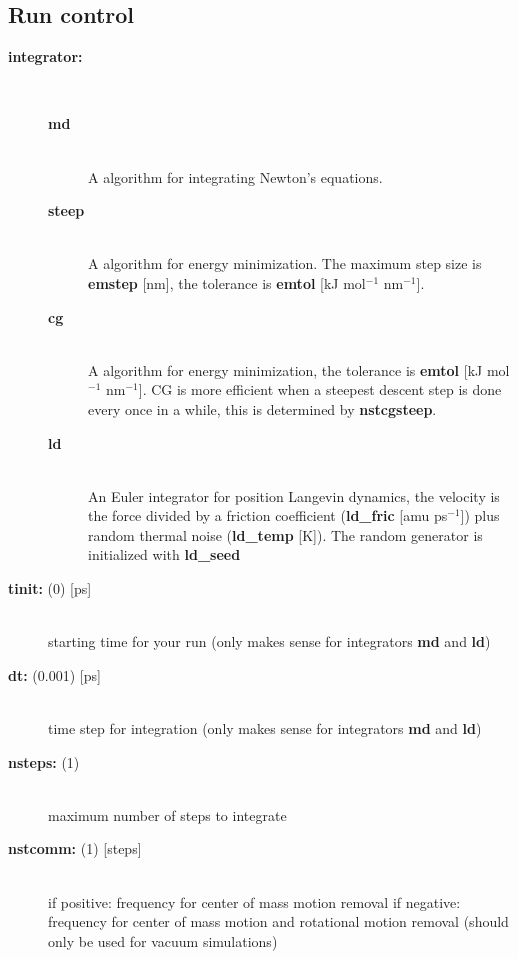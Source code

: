 \subsection{Run control}
\begin{description}
\item[{\bf integrator:}]\mbox{}\\
\vspace{-2ex}\begin{description}
\item[{\bf md} ]\mbox{}\\
A  algorithm for integrating Newton's
equations.
\item[{\bf steep}]\mbox{}\\
A  algorithm for energy
minimization. The maximum step size is {\bf emstep}
[nm], the tolerance is {\bf emtol} [kJ
mol$^{-1}$ nm$^{-1}$].
\item[{\bf cg}]\mbox{}\\
 A  algorithm for energy
minimization, the tolerance is {\bf emtol} [kJ mol$^{-1}$
nm$^{-1}$].  CG is more efficient when a steepest descent step
is done every once in a while, this is determined by 
{\bf nstcgsteep}.
\item[{\bf ld}]\mbox{}\\
 An Euler integrator for position Langevin dynamics, the
velocity is the force divided by a friction coefficient 
({\bf ld\_fric} [amu ps$^{-1}$])
plus random thermal noise ({\bf ld\_temp} [K]). 
The random generator is initialized with {\bf ld\_seed}
\end{description}
\item[{\bf tinit: }(0) {[ps]}]\mbox{}\\
starting time for your run (only makes sense for integrators {\bf md} 
and {\bf ld})
\item[{\bf dt: }(0.001) {[ps]}]\mbox{}\\
time step for integration (only makes sense for integrators {\bf md} 
and {\bf ld})
\item[{\bf nsteps: }(1)]\mbox{}\\
maximum number of steps to integrate
\item[{\bf nstcomm: }(1) {[steps]}]\mbox{}\\
if positive: frequency for center of mass motion removal
if negative: frequency for center of mass motion and rotational 
motion removal (should only be used for vacuum simulations)
\end{description}

